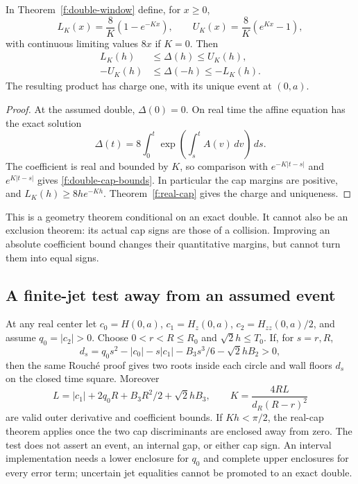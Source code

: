 \begin{corollary}\label{f:double-caps}
In Theorem~\ref{f:double-window} define, for $x\ge0$,
\begin{equation}\label{f:LU}
 L_K(x)=\frac8K(1-e^{-Kx}),\qquad
 U_K(x)=\frac8K(e^{Kx}-1),
\end{equation}
with continuous limiting values $8x$ if $K=0$.  Then
\begin{equation}\label{f:double-cap-bounds}
 \begin{split}
 L_K(h)&\le\Delta(h)\le U_K(h),\\
 -U_K(h)&\le\Delta(-h)\le-L_K(h).
 \end{split}
\end{equation}
The resulting product has charge one, with its unique event at $(0,a)$.
\end{corollary}

\begin{proof}
At the assumed double, $\Delta(0)=0$.  On real time the affine equation
has the exact solution
\[
 \Delta(t)=8\int_0^t
       \exp\left(\int_s^t A(v)\,dv\right)\,ds.
\]
The coefficient is real and bounded by $K$, so comparison with
$e^{-K|t-s|}$ and $e^{K|t-s|}$ gives
\eqref{f:double-cap-bounds}.  In particular the cap margins are
positive, and $L_K(h)\ge8he^{-Kh}$.  Theorem~\ref{f:real-cap}
gives the charge and uniqueness.
\end{proof}

This is a geometry theorem conditional on an exact double.  It cannot
also be an exclusion theorem: its actual cap signs are those of a
collision.  Improving an absolute coefficient bound changes their
quantitative margins, but cannot turn them into equal signs.

\subsection{A finite-jet test away from an assumed event}

At any real center let
$c_0=H(0,a)$, $c_1=H_z(0,a)$, $c_2=H_{zz}(0,a)/2$, and assume
$q_0=|c_2|>0$.  Choose $0<r<R\le R_0$ and
$\sqrt2h\le T_0$.  If, for $s=r,R$,
\begin{equation}\label{f:off-event}
 d_s=q_0s^2-|c_0|-s|c_1|-B_3s^3/6-\sqrt2hB_2>0,
\end{equation}
then the same Rouch\'e proof gives two roots inside each circle and
wall floors $d_s$ on the closed time square.  Moreover
\begin{equation}\label{f:off-event-A}
 L=|c_1|+2q_0R+B_3R^2/2+\sqrt2hB_3,
 \qquad K=\frac{4RL}{d_R(R-r)^2}
\end{equation}
are valid outer derivative and coefficient bounds.  If $Kh<\pi/2$,
the real-cap theorem applies once the two cap discriminants are
enclosed away from zero.  The test does not assert an event, an
internal gap, or either cap sign.  An interval implementation needs a
lower enclosure for $q_0$ and complete upper enclosures for every
error term; uncertain jet equalities cannot be promoted to an exact
double.

